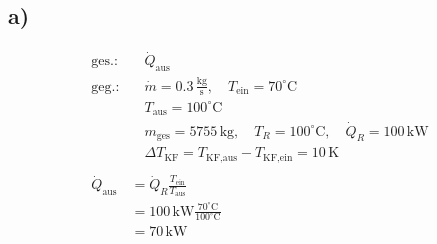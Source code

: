 

\subsection*{a)}
\begin{align*}
\text{ges.:} & \quad \dot{Q}_{\text{aus}} \\
\text{geg.:} & \quad \dot{m} = 0.3 \, \frac{\text{kg}}{\text{s}}, \quad T_{\text{ein}} = 70^\circ \text{C} \\
& \quad T_{\text{aus}} = 100^\circ \text{C} \\
& \quad m_{\text{ges}} = 5755 \, \text{kg}, \quad T_R = 100^\circ \text{C}, \quad \dot{Q}_R = 100 \, \text{kW} \\
& \quad \Delta T_{\text{KF}} = T_{\text{KF,aus}} - T_{\text{KF,ein}} = 10 \, \text{K} \\
\\
\dot{Q}_{\text{aus}} & = \dot{Q}_R \frac{T_{\text{ein}}}{T_{\text{aus}}} \\
& = 100 \, \text{kW} \frac{70^\circ \text{C}}{100^\circ \text{C}} \\
& = 70 \, \text{kW}
\end{align*}